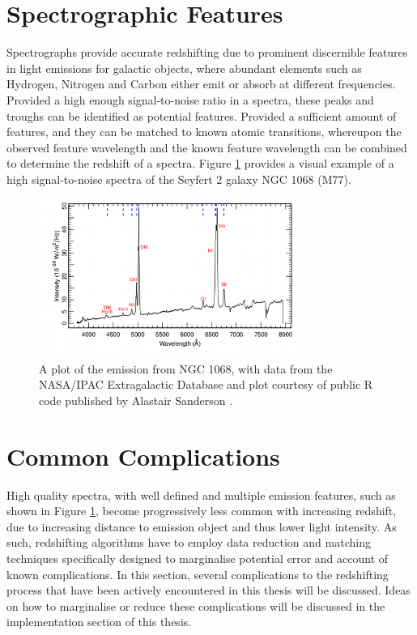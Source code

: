 \documentclass[titlesmallcaps, examinerscopy, copyrightpage]{uqthesis}
\begin{document}
\section{Spectrographic Features}

Spectrographs provide accurate redshifting due to prominent discernible features in light emissions for galactic objects, where abundant elements such as Hydrogen, Nitrogen and Carbon either emit or absorb at different frequencies. Provided a high enough signal-to-noise ratio in a spectra, these peaks and troughs can be identified as potential features. Provided a sufficient amount of features, and they can be matched to known atomic transitions, whereupon the observed feature wavelength and the known feature wavelength can be combined to determine the redshift of a spectra. Figure \ref{fig:emission} provides a visual example of a high signal-to-noise spectra of the Seyfert 2 galaxy NGC 1068 (M77).

\begin{figure}[ht!]
\includegraphics[width=0.75\textwidth]{images/M77_opt_spectrum.png} 
\centering
\caption{A plot of the emission from NGC 1068, with data from the NASA/IPAC Extragalactic Database\cite{nasaDB} and plot courtesy of public R code published by Alastair Sanderson \cite{emission}.}
\label{fig:emission}
\end{figure}

\section{Common Complications}

High quality spectra, with well defined and multiple emission features, such as shown in Figure \ref{fig:emission}, become progressively less common with increasing redshift, due to increasing distance to emission object and thus lower light intensity. As such, redshifting algorithms have to employ data reduction and matching techniques specifically designed to marginalise potential error and account of known complications. In this section, several complications to the redshifting process that have been actively encountered in this thesis will be discussed. Ideas on how to marginalise or reduce these complications will be discussed in the implementation section of this thesis.
\end{document}
